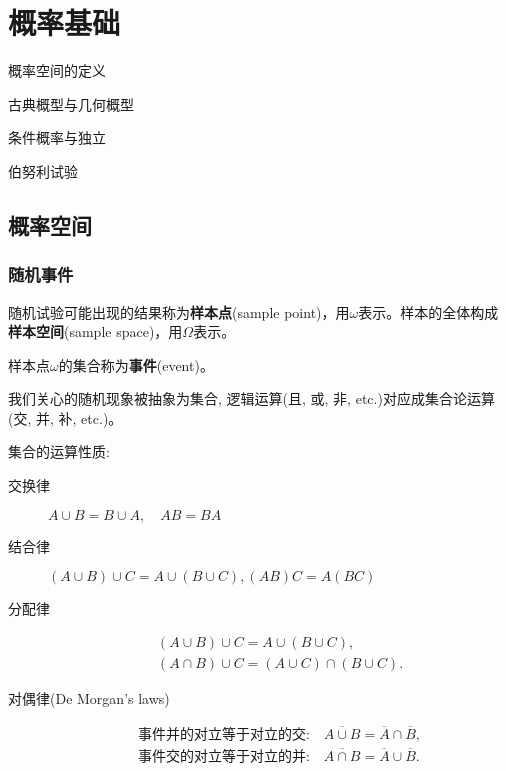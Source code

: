 \chapter{概率基础}\label{chap:probability_space}

\begin{introduction}[考试重点]
    \item 概率空间的定义
    \item 古典概型与几何概型
    \item 条件概率与独立
    \item 伯努利试验
\end{introduction}

\section{概率空间}

\subsection{随机事件}

\begin{definition}[样本空间]
    随机试验可能出现的结果称为\textbf{样本点}(sample point)，用$\omega$表示。样本的全体构成\textbf{样本空间}(sample space)，用$\Omega$表示。
\end{definition}

\begin{definition}[事件的古典定义]
    样本点$\omega$的集合称为\textbf{事件}(event)。
\end{definition}

我们关心的随机现象被抽象为集合, 逻辑运算(且, 或, 非, etc.)对应成集合论运算(交, 并, 补, etc.)。

\begin{property}
    集合的运算性质:
    \begin{description}
        \item [交换律] $A \cup B = B \cup A, \quad AB = BA$
        \item [结合律] $(A \cup B) \cup C = A \cup (B \cup C), (AB)C = A(BC)$
        \item [分配律]
              \begin{gather}
                  (A \cup B) \cup C = A \cup (B \cup C),\\
                  (A \cap B) \cup C = (A \cup C) \cap (B \cup C).
              \end{gather}
        \item [对偶律(De Morgan's laws)]
              \begin{gather}
                  \text{事件并的对立等于对立的交:} \quad \overline{A \cup B} = \overline{A} \cap \overline{B},\\
                  \text{事件交的对立等于对立的并:} \quad \overline{A \cap B} = \overline{A} \cup \overline{B}.
              \end{gather}
    \end{description}
\end{property}

